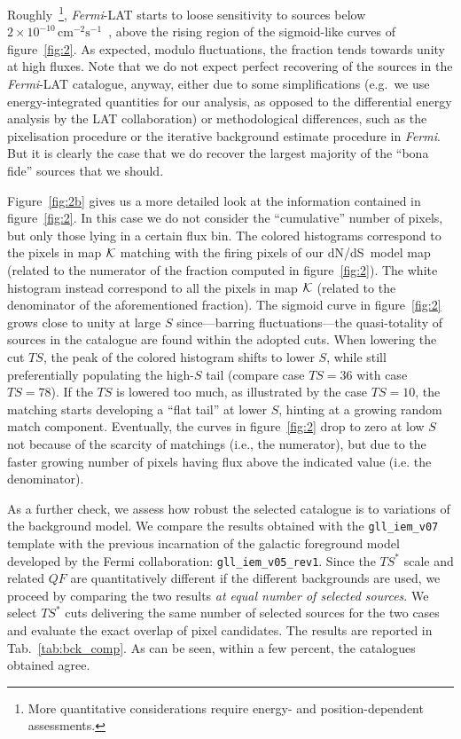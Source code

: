 \documentclass{article}
\def\dNdS{\textrm{d}N/\textrm{d}S}
\newcommand{\Fermi}{\textit{Fermi}}
\begin{document}
Roughly~\footnote{More quantitative considerations require energy- and position-dependent assessments.}, \Fermi-LAT starts to loose sensitivity to sources below $2\times 10^{-10}\, \textrm{cm}^{-2}\textrm{s}^{-1}$~\cite{Cuoco-1pdf,DiMauro:2017ing,Marcotulli:2020fpm,Amerio:2023uet}, above the rising region of the sigmoid-like curves of figure~\ref{fig:2}. As expected, modulo fluctuations, the fraction tends towards unity at high fluxes. Note that we do not expect perfect recovering of the sources in the \Fermi-LAT catalogue, anyway, either due to some simplifications (e.g.~we use energy-integrated quantities for our analysis, as opposed to the differential energy analysis by the LAT collaboration) or methodological differences, such as the pixelisation procedure or the iterative background estimate procedure in \Fermi. But it is clearly the case that we do recover the largest majority of the ``bona fide'' sources that we should. 

%
Figure~\ref{fig:2b} gives us a more detailed look at the information contained in figure~\ref{fig:2}. In this case we do not consider the ``cumulative'' number of pixels, but only those lying in a certain flux bin. The colored histograms correspond to the pixels in map ${\cal K}$ matching with the firing pixels of our \dNdS~model map (related to the numerator of the fraction computed in figure~\ref{fig:2}). The white histogram instead correspond to all the pixels in map ${\cal K}$ (related to the denominator of the aforementioned fraction). The sigmoid curve in figure~\ref{fig:2} grows close to unity at large $S$ since---barring fluctuations---the quasi-totality of sources in the catalogue are found within the adopted cuts. When lowering the cut $TS$, the peak of the colored histogram shifts to lower $S$, while still preferentially populating the high-$S$ tail (compare case $TS=36$ with case $TS=78$). If the $TS$ is lowered too much, as illustrated by the case $TS=10$, the matching starts developing a ``flat tail'' at lower $S$, hinting at a growing  random match component. Eventually, the curves in figure~\ref{fig:2} drop to zero at low $S$ not because of the scarcity of matchings (i.e., the numerator), but due to the faster growing number of pixels having flux above the indicated value (i.e. the denominator).

As a further check, we assess how  robust the selected catalogue is to variations of the background model. We compare the results obtained with the \verb|gll_iem_v07| template with the previous incarnation of the galactic foreground model developed by the Fermi collaboration: \verb|gll_iem_v05_rev1|. Since the $TS^*$ scale and related $QF$ are quantitatively different if the different backgrounds are used, we proceed by comparing the two results \textit{at equal number of selected sources}.  We select $TS^*$ cuts delivering the same number of selected sources for the two cases and evaluate the exact overlap of pixel candidates. The results are reported in Tab.~\ref{tab:bck_comp}. As can be seen, within a few percent, the catalogues obtained agree.
\end{document}
